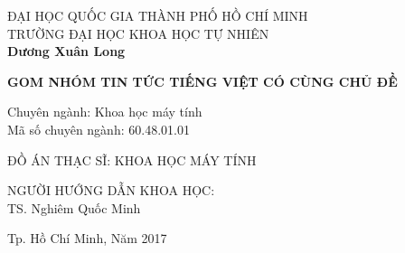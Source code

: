 \begin{titlepage}

\begin{center}
ĐẠI HỌC QUỐC GIA THÀNH PHỐ HỒ CHÍ MINH\\
TRƯỜNG ĐẠI HỌC KHOA HỌC TỰ NHIÊN\\[2cm]

{ \LARGE \bfseries Dương Xuân Long\\[1cm] } 

{ \huge \bfseries GOM NHÓM TIN TỨC TIẾNG VIỆT CÓ CÙNG CHỦ ĐỀ\\[1cm] } 


\begin{flushleft} \large
Chuyên ngành: Khoa học máy tính\\
Mã số chuyên ngành: 60.48.01.01\\[2cm]
\end{flushleft}

\large ĐỒ ÁN THẠC SĨ: KHOA HỌC MÁY TÍNH\\[1cm]


\begin{flushright} \large
NGƯỜI HƯỚNG DẪN KHOA HỌC:\\
TS. Nghiêm Quốc Minh
\end{flushright}


\vfill
Tp. Hồ Chí Minh, Năm 2017

\end{center}

\end{titlepage}